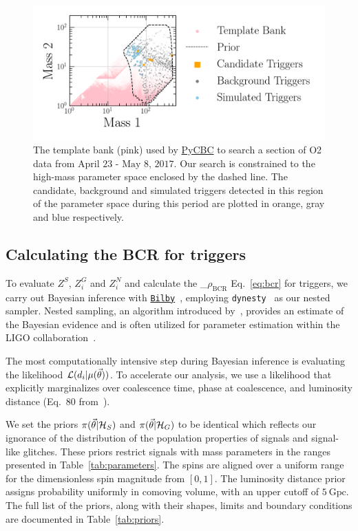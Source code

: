 \documentclass[%
 nofootinbib,
 amsmath,amssymb,
 aps,
 twocolumn,
 superscriptaddress
]{revtex4-2}
\newcommand{\bilby}{{\sc \href{https://lscsoft.docs.ligo.org/bilby/}{\texttt{Bilby}}}\xspace}
\newcommand{\dynesty}{{\sc \texttt{dynesty}}\xspace}
\newcommand{\pycbc}{{\sc \href{https://pycbc.org/}{{PyCBC}}}\xspace}
\newcommand{\mathcmd}[1]{{\sc \relax\ifmmode#1\else $#1$\fi}\xspace}
\newcommand{\bcr}{\mathcmd{\rho_\text{BCR}}}
\newcommand{\parameters}{\mathcmd{\vec{\theta}}}
\newcommand{\template}{\mathcmd{\mu(\parameters)}}
\begin{document}
\begin{figure}[!ht]

{\centering \includegraphics[width=0.75\linewidth]{images/template_bank.png}

}
\caption[High-mass BCR search space.]{The template bank (pink) used by \pycbc to search a section of O2 data from $\text{April 23 - May 8, 2017}$. Our search is constrained to the high-mass parameter space enclosed by the dashed line. The candidate, background and simulated triggers detected in this region of the parameter space during this period are plotted in orange, gray and blue respectively.}\label{fig:templateBank}
\end{figure}


\subsection{Calculating the BCR for triggers}
To evaluate $Z^S$, $Z^G_i$ and $Z^N_i$ and calculate the \bcr Eq.~\ref{eq:bcr} for triggers, we carry out Bayesian inference with \bilby~\cite{bilby, bilby_pipe}, employing \dynesty~\cite{dynesty} as our nested sampler. Nested sampling, an algorithm introduced by~\citet{skilling2004, skilling2006}, provides an estimate of the Bayesian evidence and is often utilized for parameter estimation within the LIGO collaboration~\cite{bilby, bilby_paper, pbilby_paper}.

The most computationally intensive step during Bayesian inference is evaluating the likelihood $\mathcal{L}(d_i|\template)$. To accelerate our analysis, we use a likelihood that explicitly marginalizes over coalescence time, phase at coalescence, and luminosity distance (Eq.~80 from~\citet{intro_to_gw_bayes}).

We set the priors $\pi(\parameters|\mathcal{H}_S)$ and $\pi(\parameters|\mathcal{H}_G)$ to be identical which reflects our ignorance of the distribution of the population properties of signals and signal-like glitches. These priors restrict signals with mass parameters in the ranges presented in Table~\ref{tab:parameters}. The spins are aligned over a uniform range for the dimensionless spin magnitude from $\left[0,1\right]$. The luminosity distance prior assigns probability uniformly in comoving volume, with an upper cutoff of $5\ \text{Gpc}$. The full list of the priors, along with their shapes, limits and boundary conditions are documented in Table~\ref{tab:priors}. 
\end{document}
